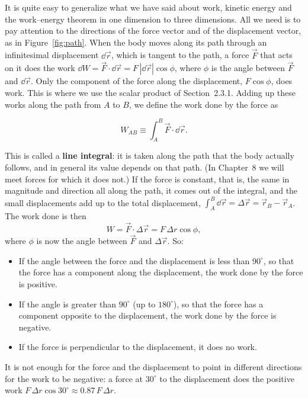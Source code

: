 \documentclass[11pt,a4paper]{article}
\begin{document}
It is quite easy to generalize what we have said about work, kinetic energy and the work--energy
theorem in one dimension to three dimensions. All we need is to pay attention to the directions of the
force vector and of the displacement vector, as in Figure~\ref{fig:path}. When the body moves along
its path through an infinitesimal displacement $\dd\vec{r}$, which is tangent to the path, a force
$\vec{F}$ that acts on it does the work $\dd W = \vec{F}\cdot\dd\vec{r} = F\,|\dd\vec{r}|\cos\phi$,
where $\phi$ is the angle between $\vec{F}$ and $\dd\vec{r}$. Only the component of the force along
the displacement, $F\cos\phi$, does work. This is where we use the scalar product of Section~2.3.1.
Adding up these works along the path from $A$ to $B$, we define the work done by the force as
\begin{keyresult}
\begin{equation}\label{eq:W-line}
  W_{AB} \equiv \int_A^B \vec{F}\cdot\dd\vec{r} .
\end{equation}
\end{keyresult}
This is called a \textbf{line integral}: it is taken along the path that the body actually follows,
and in general its value depends on that path. (In Chapter~8 we will meet forces for which it does
not.) If the force is constant, that is, the same in magnitude and direction all along the path, it
comes out of the integral, and the small displacements add up to the total displacement,
$\int_A^B \dd\vec{r} = \Delta\vec{r} = \vec{r}_B - \vec{r}_A$. The work done is then
\begin{equation}\label{eq:W-dot}
  W = \vec{F}\cdot\Delta\vec{r} = F\,\Delta r\cos\phi ,
\end{equation}
where $\phi$ is now the angle between $\vec{F}$ and $\Delta\vec{r}$. So:
\begin{itemize}
  \item If the angle between the force and the displacement is less than $90^\circ$, so that the force
    has a component along the displacement, the work done by the force is positive.
  \item If the angle is greater than $90^\circ$ (up to $180^\circ$), so that the force has a component
    opposite to the displacement, the work done by the force is negative.
  \item If the force is perpendicular to the displacement, it does no work.
\end{itemize}
It is not enough for the force and the displacement to point in different directions for the work to
be negative: a force at $30^\circ$ to the displacement does the positive work
$F\,\Delta r\cos 30^\circ \approx 0.87\,F\,\Delta r$.
\end{document}
